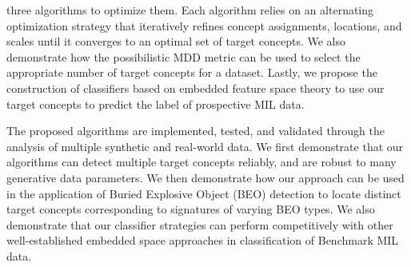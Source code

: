 \documentclass[12pt,dvips]{report}
\numberwithin{equation}{section}
\begin{document}
\restoregeometry 
three algorithms to optimize them.  Each algorithm relies on an alternating optimization strategy that iteratively refines concept assignments, locations, and scales until it converges to an optimal set of target concepts.  We also demonstrate how the possibilistic MDD metric can be used to select the appropriate number of target concepts for a dataset.  Lastly, we propose the construction of classifiers based on embedded feature space theory to use our target concepts to predict the label of prospective MIL data.

The proposed algorithms are implemented, tested, and validated through the analysis of multiple synthetic and real-world data.  We first demonstrate that our algorithms can detect multiple target concepts reliably, and are robust to many generative data parameters.  We then demonstrate how our approach can be used in the application of Buried Explosive Object (BEO) detection to locate distinct target concepts corresponding to signatures of varying BEO types.  We also demonstrate that our classifier strategies can perform competitively with other well-established embedded space approaches in classification of Benchmark MIL data.



\end{document}
